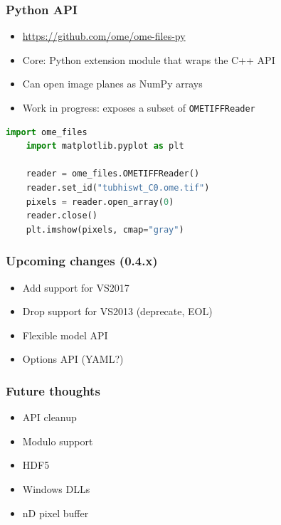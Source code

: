 \documentclass{beamer}
\begin{document}
\begin{frame}[fragile]
  \frametitle{Python API}

  \begin{itemize}
  \item \url{https://github.com/ome/ome-files-py}
  \item Core: Python extension module that wraps the C++ API
  \item Can open image planes as NumPy arrays
  \item Work in progress: exposes a subset of \texttt{OMETIFFReader}
  \end{itemize}
  \begin{lstlisting}[language=Python]
    import ome_files
    import matplotlib.pyplot as plt

    reader = ome_files.OMETIFFReader()
    reader.set_id("tubhiswt_C0.ome.tif")
    pixels = reader.open_array(0)
    reader.close()
    plt.imshow(pixels, cmap="gray")
  \end{lstlisting}

\end{frame}

\begin{frame}[fragile]
  \frametitle{Upcoming changes (0.4.x)}

  \begin{itemize}
  \item Add support for VS2017
  \item Drop support for VS2013 (deprecate, EOL)
  \item Flexible model API
  \item Options API (YAML?)
  \end{itemize}
\end{frame}

\begin{frame}[fragile]
  \frametitle{Future thoughts}

  \begin{itemize}
  \item API cleanup
  \item Modulo support
  \item HDF5
  \item Windows DLLs
  \item nD pixel buffer
  \end{itemize}
\end{frame}
\end{document}
